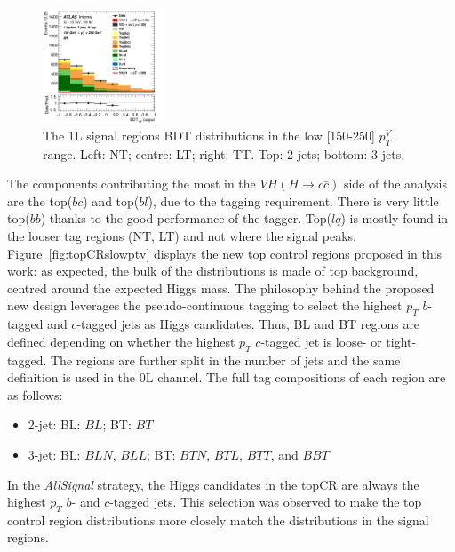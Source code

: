 \begin{figure}[h!]
\includegraphics[width=0.32\textwidth]{Images/VH/SRsandTopCRs/Region_distmva_DSR_BMax250_L1_Y6051_TTypett_T2_J3_BMin150_Prefit.png}
\caption{The 1L signal regions BDT distributions in the low [150-250] $p_T^V$ range. Left: NT; centre: LT; right: TT. Top: 2 jets; bottom: 3 jets.} 
\label{fig:SRslowptv}
\end{figure}

The components contributing the most in the $VH(H\rightarrow c\bar{c})$ side of the analysis are the top($bc$) and top($bl$), due to the tagging requirement. There is very little top($bb$) thanks to the good performance of the tagger. Top($lq$) is mostly found in the looser tag regions (NT, LT) and not where the signal peaks. Figure~\ref{fig:topCRslowptv} displays the new top control regions proposed in this work: as expected, the bulk of the distributions is made of top background, centred around the expected Higgs mass. The philosophy behind the proposed new design leverages the pseudo-continuous tagging to select the highest $p_T$ $b$-tagged and $c$-tagged jets as Higgs candidates. Thus, BL and BT regions are defined depending on whether the highest $p_T$ $c$-tagged jet is loose- or tight-tagged. The regions are further split in the number of jets and the same definition is used in the 0L channel. The full tag compositions of each region are as follows:

\begin{itemize}
\item 2-jet: \quad BL: $BL$;  \quad BT: $BT$
\item 3-jet:  \quad BL: $BLN$, $BLL$;  \quad BT: $BTN$, $BTL$, $BTT$, and $BBT$
\end{itemize}
In the \textit{AllSignal} strategy, the Higgs candidates in the topCR are always the highest $p_T$ $b$- and $c$-tagged jets. This selection was observed to make the top control region distributions more closely match the distributions in the signal regions. \\

